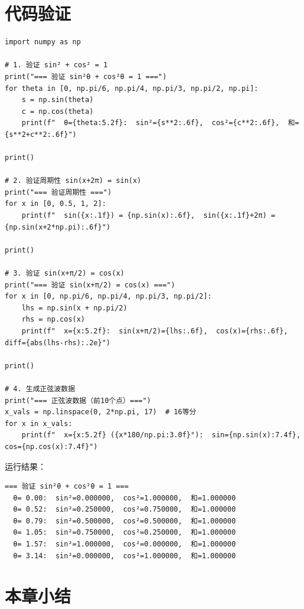 \section{代码验证}

\begin{lstlisting}[caption=三角函数的数值验证]
import numpy as np

# 1. 验证 sin² + cos² = 1
print("=== 验证 sin²θ + cos²θ = 1 ===")
for theta in [0, np.pi/6, np.pi/4, np.pi/3, np.pi/2, np.pi]:
    s = np.sin(theta)
    c = np.cos(theta)
    print(f"  θ={theta:5.2f}:  sin²={s**2:.6f},  cos²={c**2:.6f},  和={s**2+c**2:.6f}")

print()

# 2. 验证周期性 sin(x+2π) = sin(x)
print("=== 验证周期性 ===")
for x in [0, 0.5, 1, 2]:
    print(f"  sin({x:.1f}) = {np.sin(x):.6f},  sin({x:.1f}+2π) = {np.sin(x+2*np.pi):.6f}")

print()

# 3. 验证 sin(x+π/2) = cos(x)
print("=== 验证 sin(x+π/2) = cos(x) ===")
for x in [0, np.pi/6, np.pi/4, np.pi/3, np.pi/2]:
    lhs = np.sin(x + np.pi/2)
    rhs = np.cos(x)
    print(f"  x={x:5.2f}:  sin(x+π/2)={lhs:.6f},  cos(x)={rhs:.6f},  diff={abs(lhs-rhs):.2e}")

print()

# 4. 生成正弦波数据
print("=== 正弦波数据（前10个点）===")
x_vals = np.linspace(0, 2*np.pi, 17)  # 16等分
for x in x_vals:
    print(f"  x={x:5.2f} ({x*180/np.pi:3.0f}°):  sin={np.sin(x):7.4f},  cos={np.cos(x):7.4f}")
\end{lstlisting}

运行结果：
\begin{lstlisting}[frame=none,backgroundcolor={},numbers=none]
=== 验证 sin²θ + cos²θ = 1 ===
  θ= 0.00:  sin²=0.000000,  cos²=1.000000,  和=1.000000
  θ= 0.52:  sin²=0.250000,  cos²=0.750000,  和=1.000000
  θ= 0.79:  sin²=0.500000,  cos²=0.500000,  和=1.000000
  θ= 1.05:  sin²=0.750000,  cos²=0.250000,  和=1.000000
  θ= 1.57:  sin²=1.000000,  cos²=0.000000,  和=1.000000
  θ= 3.14:  sin²=0.000000,  cos²=1.000000,  和=1.000000
\end{lstlisting}


\section{本章小结}

